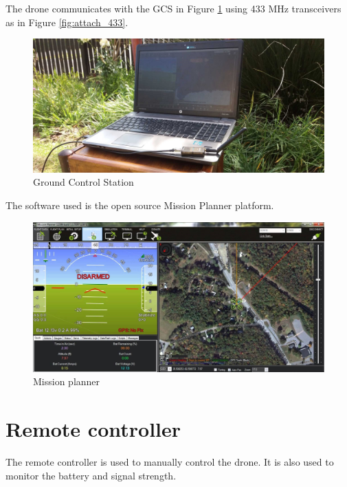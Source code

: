 The drone communicates with the GCS in Figure \ref{fig:gcs} using 433 MHz transceivers as in Figure \ref{fig:attach_433}.

\begin{figure}[H]
\centering
\includegraphics[scale=0.17]{images/gcs.jpg}
\caption{Ground Control Station}
\label{fig:gcs}
\end{figure}

The software used is the open source Mission Planner platform.

\begin{figure}[H]
\centering
\includegraphics[scale=0.2]{images/mp.jpg}
\caption{Mission planner}
\label{fig:mission_planner}
\end{figure}

\section{Remote controller}
\label{sec:remote_controller}

The remote controller is used to manually control the drone. It is also used to monitor the battery and signal strength.\\

